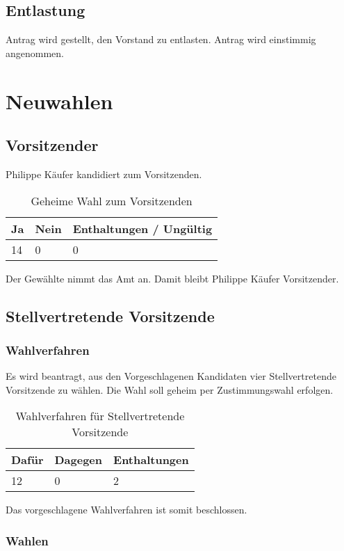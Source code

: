 \documentclass[a4paper]{scrartcl}
\begin{document}
\subsection{Entlastung}
Antrag wird gestellt, den Vorstand zu entlasten. Antrag wird einstimmig angenommen.

\section{Neuwahlen}

\subsection{Vorsitzender}
Philippe Käufer kandidiert zum Vorsitzenden.
\begin{table}[H]
\begin{tabularx}{\textwidth}{XXX}
Ja & Nein & Enthaltungen / Ungültig\\
\toprule
14 & 0 & 0\\
\end{tabularx}
\caption{Geheime Wahl zum Vorsitzenden}
\end{table}
Der Gewählte nimmt das Amt an. Damit bleibt Philippe Käufer Vorsitzender.

\subsection{Stellvertretende Vorsitzende}
\subsubsection{Wahlverfahren}

Es wird beantragt, aus den Vorgeschlagenen Kandidaten vier Stellvertretende Vorsitzende zu wählen. Die Wahl soll geheim per Zustimmungswahl erfolgen.
\begin{table}[H]
\begin{tabularx}{\textwidth}{XXX}
Dafür & Dagegen & Enthaltungen\\
\toprule
12 & 0 & 2 \\
\end{tabularx}
\caption{Wahlverfahren für Stellvertretende Vorsitzende}
\end{table}
Das vorgeschlagene Wahlverfahren ist somit beschlossen.

\subsubsection{Wahlen}
\end{document}
